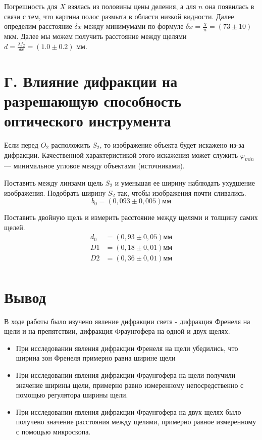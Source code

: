 Погрешность для $X$ взялась из половины цены деления, а для $n$ она появилась в связи с тем, что картина полос размыта в области низкой видности.
Далее определим расстояние $\delta x$ между минимумами по формуле $\delta x = \frac{X}{n} = (73 \pm 10)$ мкм. Далее мы можем получить расстояние между щелями $d = \frac{\lambda f_2}{\delta x} = (1.0 \pm 0.2)$ мм.

\section*{Г. Влияние дифракции на разрешающую способность оптического инструмента}

Если перед $O_2$ расположить $S_2$, то изображение объекта будет искажено из-за дифракции. Качественной характеристикой этого искажения может служить $\varphi_{min}$ --- минимальное угловое между объектами (источниками).

Поставить между линзами щель $S_2$ и уменьшая ее ширину наблюдать ухудшение изображения. Подобрать ширину $S_2$ так, чтобы изображения почти сливались.
\[b_0 = (0,093 \pm 0,005)\text{мм}\]

Поставить двойную щель и измерить расстояние между щелями и толщину самих щелей.
\begin{align*}
d_0 &= (0,93 \pm 0,05) \text{мм}\\
D1 &= (0,18 \pm 0,01) \text{мм}\\
D2 &= (0,36 \pm 0,01) \text{мм}\\
\end{align*}

\section*{Вывод}

В ходе работы было изучено явление дифракции света - дифракция Френеля на щели и на препятствии, дифракция Фраунгофера на одной и двух щелях.

\begin{itemize}
	\item При исследовании явления дифракции Френеля на щели убедились, что ширина зон Френеля примерно равна ширине щели
	
	\item При исследовании явления дифракции Фраунгофера на щели получили значение ширины щели, примерно равно измеренному непосредственно с помощью регулятора ширины щели.
	
	\item При исследовании явления дифракции Фраунгофера на двух щелях было получено значение расстояния между щелями, примерно равное измеренному с помощью микроскопа.
\end{itemize}



